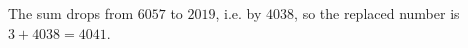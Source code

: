 The sum drops from $6057$ to $2019$, i.e. by $4038$, so the replaced number is $3+4038=\boxed{4041}$.
